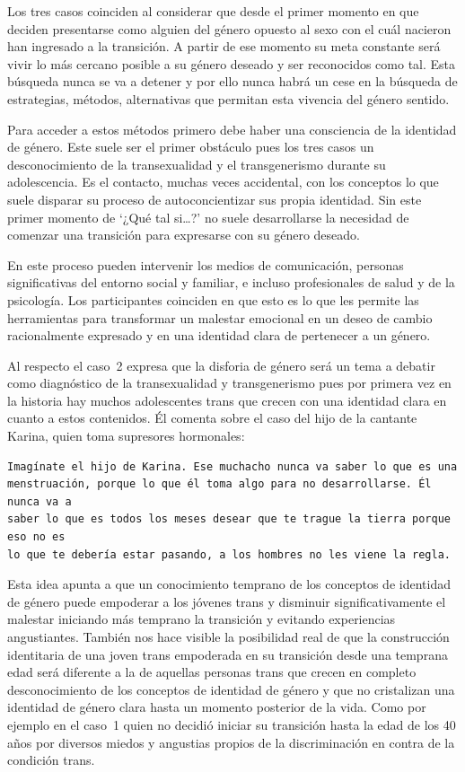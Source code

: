 Los tres casos coinciden al considerar que desde el primer momento en que
deciden presentarse como alguien del género opuesto al sexo con el cuál nacieron
han ingresado a la transición. A partir de ese momento su meta constante será
vivir lo más cercano posible a su género deseado y ser reconocidos como tal.
Esta búsqueda nunca se va a detener y por ello nunca habrá un cese en la
búsqueda de estrategias, métodos, alternativas que permitan esta vivencia del
género sentido.

Para acceder a estos métodos primero debe haber una consciencia de la identidad
de género. Este suele ser el primer obstáculo pues los tres casos un
desconocimiento de la transexualidad y el transgenerismo durante su
adolescencia. Es el contacto, muchas veces accidental, con los conceptos lo que
suele disparar su proceso de autoconcientizar sus propia identidad. Sin este
primer momento de ‘¿Qué tal si…?’ no suele desarrollarse la necesidad de
comenzar una transición para expresarse con su género deseado.

En este proceso pueden intervenir los medios de comunicación, personas
significativas del entorno social y familiar, e incluso profesionales de salud y
de la psicología. Los participantes coinciden en que esto es lo que les permite
las herramientas para transformar un malestar emocional en un deseo de cambio
racionalmente expresado y en una identidad clara de pertenecer a un género.

Al respecto el caso~2 expresa que la disforia de género será un tema a debatir
como diagnóstico de la transexualidad y transgenerismo pues por primera vez en
la historia hay muchos adolescentes trans que crecen con una identidad clara en
cuanto a estos contenidos. Él comenta sobre el caso del hijo de la cantante
Karina, quien toma supresores hormonales:

\begin{verbatim}
Imagínate el hijo de Karina. Ese muchacho nunca va saber lo que es una
menstruación, porque lo que él toma algo para no desarrollarse. Él nunca va a
saber lo que es todos los meses desear que te trague la tierra porque eso no es
lo que te debería estar pasando, a los hombres no les viene la regla.
\end{verbatim}

Esta idea apunta a que un conocimiento temprano de los conceptos de identidad de
género puede empoderar a los jóvenes trans y disminuir significativamente el
malestar iniciando más temprano la transición y evitando experiencias
angustiantes. También nos hace visible la posibilidad real de que la
construcción identitaria de una joven trans empoderada en su transición desde
una temprana edad será diferente a la de aquellas personas trans que crecen en
completo desconocimiento de los conceptos de identidad de género y que no
cristalizan una identidad de género clara hasta un momento posterior de la vida.
Como por ejemplo en el caso~1 quien no decidió iniciar su transición hasta la
edad de los 40 años por diversos miedos y angustias propios de la discriminación
en contra de la condición trans.

